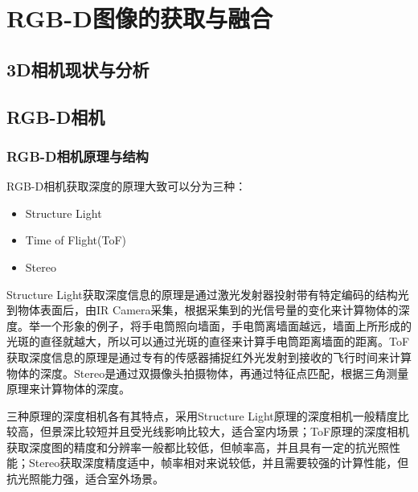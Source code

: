 \chapter{RGB-D图像的获取与融合}
\label{chap:rgbd}

\section{3D相机现状与分析}

\section{RGB-D相机}
\subsection{RGB-D相机原理与结构}
RGB-D相机获取深度的原理大致可以分为三种：
\begin{itemize}
\item Structure Light
\item Time of Flight(ToF)
\item Stereo
\end{itemize}

Structure Light获取深度信息的原理是通过激光发射器投射带有特定编码的结构光到物体表面后，由IR Camera采集，根据采集到的光信号量的变化来计算物体的深度。举一个形象的例子，将手电筒照向墙面，手电筒离墙面越远，墙面上所形成的光斑的直径就越大，所以可以通过光斑的直径来计算手电筒距离墙面的距离。ToF获取深度信息的原理是通过专有的传感器捕捉红外光发射到接收的飞行时间来计算物体的深度。Stereo是通过双摄像头拍摄物体，再通过特征点匹配，根据三角测量原理来计算物体的深度。

三种原理的深度相机各有其特点，采用Structure Light原理的深度相机一般精度比较高，但景深比较短并且受光线影响比较大，适合室内场景；ToF原理的深度相机获取深度图的精度和分辨率一般都比较低，但帧率高，并且具有一定的抗光照性能；Stereo获取深度精度适中，帧率相对来说较低，并且需要较强的计算性能，但抗光照能力强，适合室外场景。

